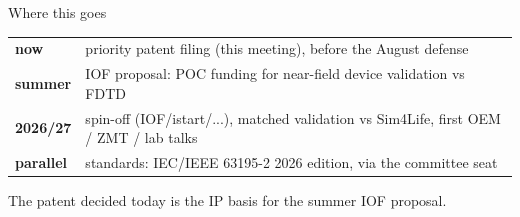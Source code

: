 \documentclass[aspectratio=169, 10pt]{beamer}
\begin{document}
\begin{frame}[t]{Where this goes}
  \vspace{4pt}
  \begin{center}\small
  \renewcommand{\arraystretch}{1.8}
  \begin{tabular}{ll}
    \toprule
    \textbf{now}      & priority patent filing (this meeting), before the August defense \\
    \textbf{summer}   & IOF proposal: POC funding for near-field device validation vs FDTD \\
    \textbf{2026/27}  & spin-off (IOF/istart/...), matched validation vs Sim4Life, first OEM / ZMT / lab talks \\
    \textbf{parallel} & standards: IEC/IEEE 63195-2 2026 edition, via the committee seat \\
    \bottomrule
  \end{tabular}
  \end{center}

  \vspace{8pt}
  \begin{resultbox}\centering
    The patent decided today is the IP basis for the summer IOF proposal.
  \end{resultbox}
\end{frame}
\end{document}
